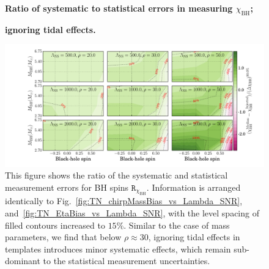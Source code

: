 \documentclass[aps,prd,amsmath,floats,floatfix, twocolumn,
superscriptaddress,nofootinbib,showpacs]{revtex4-1}
\newcommand{\chibh}{\chi_\mathrm{BH}}
\newcommand{\arr}{\mathtt{R}}
\begin{document}
\begin{figure}
\centering
\textbf{Ratio of systematic to statistical errors in measuring $\chibh$;}\par
\textbf{ignoring tidal effects.}\par\medskip
\includegraphics[width=1.95\columnwidth]{plots/TNChiBHBiasesOverCIWidths_CI90_0_Lambda_SNR_linear}
\caption{This figure shows the ratio of the systematic and statistical
measurement errors for BH spins $\arr_{\chibh}$. Information is arranged identically
to Fig.~\ref{fig:TN_chirpMassBias_vs_Lambda_SNR}, 
and~\ref{fig:TN_EtaBias_vs_Lambda_SNR}, with the level spacing of filled contours
increased to $15\%$.
Similar to the case of mass parameters, we find that below $\rho\approx 30$,
ignoring tidal effects in templates introduces minor systematic effects,
which remain sub-dominant to the statistical measurement uncertainties.
}
\label{fig:TN_BHspinBias_vs_Lambda_SNR}
\end{figure}
%
% 
\end{document}
